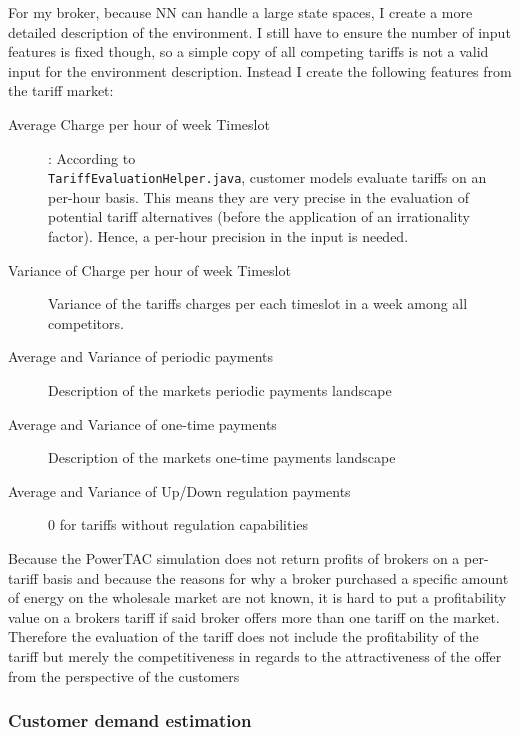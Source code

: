 For my broker, because \ac {NN} can handle a large state spaces, I create a more detailed description of the
environment. I still have to ensure the number of input features is fixed though, so a simple copy of all competing
tariffs is not a valid input for the environment description. Instead I create the following features from the tariff
market:

\begin{description} \item[Average Charge per hour of week Timeslot]: According to \\
	\texttt{TariffEvaluationHelper.java}, customer models evaluate tariffs on an per-hour basis. This means they are
	very precise in the evaluation of potential tariff alternatives (before the application of an irrationality
	factor). Hence, a per-hour precision in the input is needed.  \item[Variance of Charge per hour of week
	Timeslot] Variance of the tariffs charges per each timeslot in a week among all competitors.  \item[Average and
	Variance of periodic payments] Description of the markets periodic payments landscape \item[Average and Variance
	of one-time payments] Description of the markets one-time payments landscape \item[Average and Variance of
	Up/Down regulation payments] 0 for tariffs without regulation capabilities \end{description}

Because the \ac {PowerTAC} simulation does not return profits of brokers on a per-tariff basis and because the reasons
for why a broker purchased a specific amount of energy on the wholesale market are not known, it is hard to put a
profitability value on a brokers tariff if said broker offers more than one tariff on the market. Therefore the
evaluation of the tariff does not include the profitability of the tariff but merely the competitiveness in regards to
the attractiveness of the offer from the perspective of the customers
%
%
\subsubsection{Customer demand estimation}%

